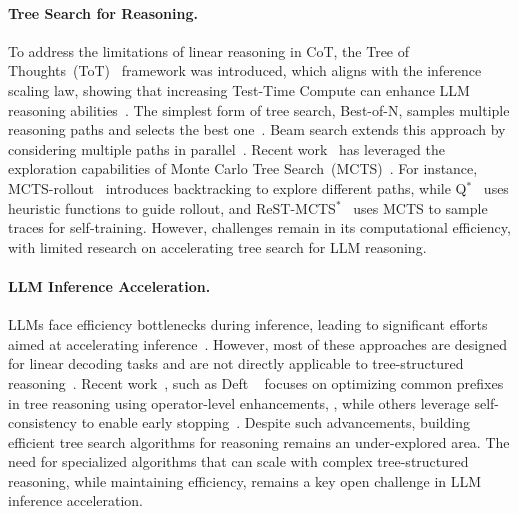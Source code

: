 \paragraph{Tree Search for Reasoning.}
To address the limitations of linear reasoning in CoT, the Tree of Thoughts~(ToT)~\cite{Yao_2023_Tree} framework was introduced, which aligns with the inference scaling law, showing that increasing Test-Time Compute can enhance LLM reasoning abilities~\cite{snell2024scaling,wu2024inference}.
The simplest form of tree search, Best-of-N, samples multiple reasoning paths and selects the best one~\cite{ cobbe2021training,lightman2023let,jiao2024learning}. Beam search extends this approach by considering multiple paths in parallel~\cite{Yao_2023_Tree}. Recent work~\cite{hao2023reasoning} has leveraged the exploration capabilities of Monte Carlo Tree Search~(MCTS)~\cite{chaslot2008monte, kocsis2006improved, browne2012survey}. For instance, MCTS-rollout~\cite{wan2024alphazero} introduces backtracking to explore different paths, while Q${^*}$~\cite{wang2024q} uses heuristic functions to guide rollout, and ReST-MCTS${^*}$~\cite{zhang2024rest} uses MCTS to sample traces for self-training. 
However, challenges remain in its computational efficiency, with limited research on accelerating tree search for LLM reasoning.

\paragraph{LLM Inference Acceleration.}
LLMs face efficiency bottlenecks during inference, leading to significant efforts aimed at accelerating inference~\cite{lin2024awq,hong2024flashdecoding++,leviathan2023fast,fu2024break,jing2023deep,cai2024medusa}. However, most of these approaches are designed for linear decoding tasks and are not directly applicable to tree-structured reasoning~\cite{li2024large, zhou2024survey}. 
Recent work~\cite{ning2023skeleton, han2024token,nayab2024concise}, such as Deft ~\cite{yao2024deft} focuses on optimizing common prefixes in tree reasoning using operator-level enhancements, , while others leverage self-consistency to enable early stopping~\cite{li2024escape, wan2024dynamic}. Despite such advancements, building efficient tree search algorithms for reasoning remains an under-explored area. The need for specialized algorithms that can scale with complex tree-structured reasoning, while maintaining efficiency, remains a key open challenge in LLM inference acceleration.
